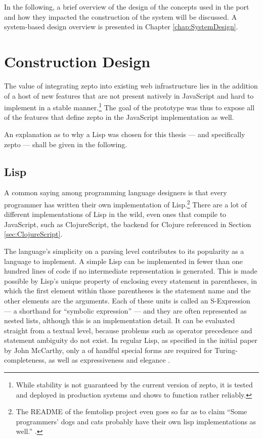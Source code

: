 \documentclass[oneside,11pt,xetex]{scrbook}
\begin{document}
In the following, a brief overview of the design of the concepts used
in the port and how they impacted the construction of the system will be
discussed. A system-based design overview is presented in Chapter \ref{chap:SystemDesign}.

\section{Construction Design}
\label{sec:ConstructionDesign}

The value of integrating zepto into existing web infrastructure lies in
the addition of a host of new features that are not present natively in
JavaScript and hard to implement in a stable manner.\footnote{While stability
is not guaranteed by the current version of zepto, it is tested and deployed
in production systems and shows to function rather reliably.}  The goal of
the prototype was thus to expose all of the features that define zepto in
the JavaScript implementation as well.

An explanation as to why a Lisp was chosen for this thesis --- and specifically
zepto --- shall be given in the following.

\subsection{Lisp}

A common saying among programming language designers is that every programmer has written
their own implementation of Lisp.\footnote{The README of the femtolisp project even goes so
far as to claim ``Some programmers' dogs and cats probably have their own lisp implementations
as well.'' \parencite{BEZL}.} There are a lot of different implementations of Lisp
in the wild, even ones that compile to JavaScript, such as ClojureScript, the
backend for Clojure referenced in Section \ref{sec:ClojureScript}.

The language's simplicity on a parsing level contributes to its popularity as
a language to implement.
A simple Lisp can be implemented in fewer than one hundred lines of code if no
intermediate representation is generated. This is made possible by Lisp's unique property
of enclosing every statement in parentheses, in which the first element within
those parentheses is the statement name and the other elements are the arguments.
Each of these units is called an S-Expression --- a shorthand for ``symbolic expression'' ---
and they are often represented as nested lists, although this is an implementation detail.
It can be evaluated straight from a textual level, because problems such as operator precedence
and statement ambiguity do not exist. In regular Lisp, as specified in the initial paper by
John McCarthy, only a of handful special forms are required for Turing-completeness, as well
as expressiveness and elegance \parencite{JCM}.
\end{document}
